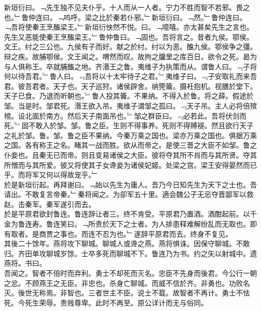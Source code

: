 \documentclass{zhvt-classic}
\begin{document}
\hspace*{2em}新垣衍曰。﹁先生独不见夫仆乎。十人而从一人者。宁力不胜而智不若邪。畏之也。﹂鲁仲连曰。﹁呜呼。梁之比於秦若仆邪。﹂新垣衍曰。﹁然。﹂鲁仲连曰。﹁吾将使秦王烹醢梁王。﹂新垣衍怏然不悦。曰。﹁噫嘻。亦太甚矣先生之言也。先生又恶能使秦王烹醢梁王。﹂鲁仲鲁曰。﹁固也。吾将言之。昔者九侯。鄂侯。文王。纣之三公也。九侯有子而好。献之於纣。纣以为恶。醢九侯。鄂侯争之彊。辩之疾。故脯鄂侯。文王闻之。喟然而叹。故拘之牖里之库百日。欲令之死。曷为与人俱称王。卒就脯醢之地。齐湣王之鲁。夷维子为执策而从。谓鲁人曰。﹃子将何以待吾君。﹄鲁人曰。﹃吾将以十太牢待子之君。﹄夷维子曰。﹃子安取礼而来吾君。彼吾君者。天子也。天子巡狩。诸侯辟舍。纳筦籥。摄衽抱机。视膳於堂下。天子已食。乃退而听朝也。﹄鲁人投其籥。不果纳。不得入於鲁。将之薛。假途於邹。当是时。邹君死。湣王欲入吊。夷维子谓邹之孤曰。﹃天子吊。主人必将倍殡棺。设北面於南方。然后天子南面吊也。﹄邹之群臣曰。﹃必若此。吾将伏剑而死。﹄固不敢入於邹。邹。鲁之臣。生则不得事养。死则不得赙襚。然且欲行天子之礼於邹。鲁。邹。鲁之臣不果纳。今秦万乘之国也。梁亦万乘之国也。俱据万乘之国。各有称王之名。睹其一战而胜。欲从而帝之。是使三晋之大臣不如邹。鲁之仆妾也。且秦无已而帝。则且变易诸侯之大臣。彼将夺其所不肖而与其所贤。夺其所憎而与其所爱。彼又将使其子女谗妾为诸侯妃姬。处梁之宫。梁王安得晏然而已乎。而将军又何以得故宠乎。﹂\\
\hspace*{2em}於是新垣衍起。再拜谢曰。﹁始以先生为庸人。吾乃今日知先生为天下之士也。吾请出。不敢复言帝秦。﹂秦将闻之。为卻军五十里。適会魏公子无忌夺晋鄙军以救赵。击秦军。秦军遂引而去。\\
\hspace*{2em}於是平原君欲封鲁连。鲁连辞让者三。终不肯受。平原君乃置酒。酒酣起前。以千金为鲁连寿。鲁连笑曰。﹁所贵於天下之士者。为人排患释难解纷乱而无取也。即有取者。是商贾之事也。而连不忍为也。﹂遂辞平原君而去。终身不复见。\\
\hspace*{2em}其後二十馀年。燕将攻下聊城。聊城人或谗之燕。燕将惧诛。因保守聊城。不敢归。齐田单攻聊城岁馀。士卒多死而聊城不下。鲁连乃为书。约之矢以射城中。遗燕将。书曰。\\
\hspace*{2em}吾闻之。智者不倍时而弃利。勇士不却死而灭名。忠臣不先身而後君。今公行一朝之忿。不顾燕王之无臣。非忠也。杀身亡聊城。而威不信於齐。非勇也。功败名灭。後世无称焉。非智也。三者世主不臣。说士不载。故智者不再计。勇士不怯死。今死生荣辱。贵贱尊卑。此时不再至。原公详计而无与俗同。\\
\end{document}
